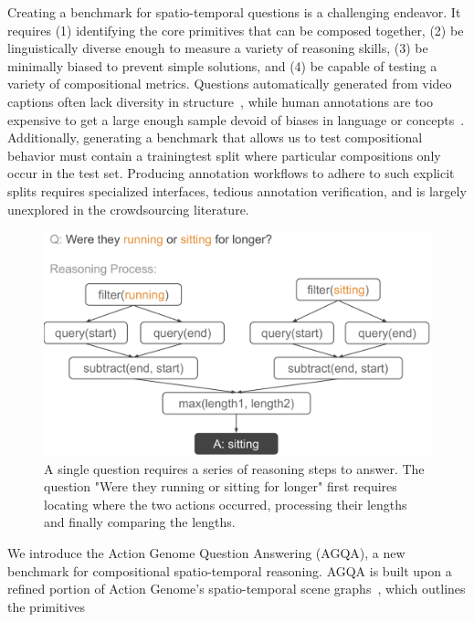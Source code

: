 Creating a benchmark for spatio-temporal questions is a challenging endeavor. It requires (1) identifying the core primitives that can be composed together, (2) be linguistically diverse enough to measure a variety of reasoning skills, (3) be minimally biased to prevent simple solutions, and (4) be capable of testing a variety of compositional metrics. 
Questions automatically generated from video captions often lack diversity in structure~\cite{yu2019activitynet,jang2017tgif}, while human annotations are too expensive to get a large enough sample devoid of biases in language or concepts~\cite{zeng2016leveraging,yu2019activitynet}. Additionally, generating a benchmark that allows us to test compositional behavior must contain a training\/test split where particular compositions only occur in the test set. Producing annotation workflows to adhere to such explicit splits requires specialized interfaces, tedious annotation verification, and is largely unexplored in the crowdsourcing literature.

\begin{figure}[t]
    \centering
    \includegraphics[width=0.95\linewidth]{figures/reasoning_tree.pdf}
    \caption{A single question requires a series of reasoning steps to answer. The question "Were they running or sitting for longer" first requires locating where the two actions occurred, processing their lengths and finally comparing the lengths.}
    \label{fig:tree}
\end{figure}

We introduce the Action Genome Question Answering (AGQA), a new benchmark for compositional spatio-temporal reasoning. AGQA is built upon a refined portion of Action Genome's spatio-temporal scene graphs~\cite{ji2020action}, which outlines the primitives 

